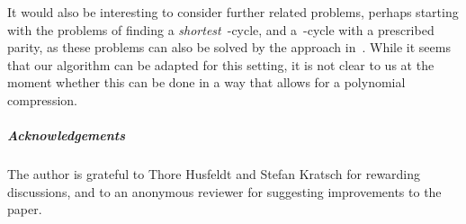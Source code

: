 \documentclass[a4paper,11pt]{article}
\begin{document}
It would also be interesting to consider further related problems, perhaps starting with
the problems of finding a \emph{shortest}~-cycle, and a~-cycle with a prescribed
parity, as these problems can also be solved by the approach in~\cite{BjorklundHT12}.
While it seems that our algorithm can be adapted for this setting, it is not clear to us
at the moment whether this can be done in a way that allows for a polynomial compression.



\subparagraph*{Acknowledgements}
The author is grateful to Thore Husfeldt and Stefan Kratsch for rewarding discussions,
and to an anonymous reviewer for suggesting improvements to the paper. 







\end{document}
